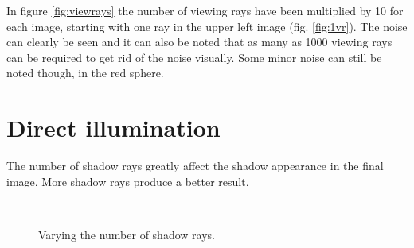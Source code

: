 \documentclass[a4paper]{report}
\begin{document}
In figure \ref{fig:viewrays} the number of viewing rays have been
multiplied by 10 for each image, starting with one ray in the upper
left image (fig. \ref{fig:1vr}). The noise can
clearly be seen and it can also be noted that as many as 1000 viewing
rays can be required to get rid of the noise visually. Some minor
noise can still be noted though, in the red sphere.

\pagebreak

\section{Direct illumination}

The number of shadow rays greatly affect the shadow appearance in the
final image. More shadow rays produce a better result.

\begin{figure}[h]
  \centering
  \\
  \caption{Varying the number of shadow rays.}
  \label{fig:srays}
\end{figure}
\end{document}
